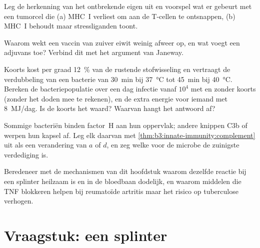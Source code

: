 \begin{exercise}[$\star\star$]\label{exo:b3:innate-immunity:8}
Leg de herkenning van het ontbrekende eigen uit en voorspel wat er
gebeurt met een tumorcel die (a) MHC~I verliest om aan de T-cellen te
ontsnappen, (b) MHC~I behoudt maar stressliganden toont.
\end{exercise}

\begin{exercise}[$\star\star$]\label{exo:b3:innate-immunity:9}
Waarom wekt een vaccin van zuiver eiwit weinig afweer op, en wat voegt
een adjuvans toe? Verbind dit met het argument van Janeway.
\end{exercise}

\begin{exercise}[$\star\star\star$]\label{exo:b3:innate-immunity:10}
Koorts kost per graad \qty{12}{\%} van de rustende stofwisseling en
vertraagt de verdubbeling van een bacterie van \qty{30}{min} bij
\qty{37}{\celsius} tot \qty{45}{min} bij \qty{40}{\celsius}. Bereken de
bacteriepopulatie over een dag infectie vanaf $10^{4}$ met en zonder
koorts (zonder het doden mee te rekenen), en de extra energie voor
iemand met \qty{8}{MJ/dag}. Is de koorts het waard? Waarvan hangt het
antwoord af?
\end{exercise}

\begin{exercise}[$\star\star\star$]\label{exo:b3:innate-immunity:11}
Sommige bacteriën binden factor~H aan hun oppervlak; andere knippen C3b
of werpen hun kapsel af. Leg elk daarvan met
\cref{thm:b3:innate-immunity:complement} uit als een verandering van
$a$ of $d$, en zeg welke voor de microbe de zuinigste verdediging is.
\end{exercise}

\begin{exercise}[$\star\star\star$]\label{exo:b3:innate-immunity:12}
Beredeneer met de mechanismen van dit hoofdstuk waarom dezelfde reactie
bij een splinter heilzaam is en in de bloedbaan dodelijk, en waarom
middelen die TNF blokkeren helpen bij reumatoïde artritis maar het
risico op tuberculose verhogen.
\end{exercise}

\section{Vraagstuk: een splinter}

